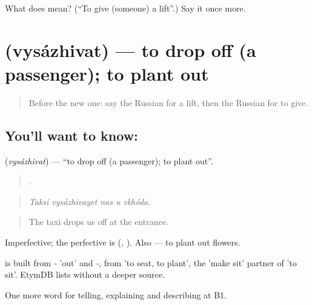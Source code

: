 \begin{tcolorbox}[breakable,colback=teal!4,colframe=teal!35!black,title={Before you move on}]
What does  mean? (\textquotedblleft{}To give (someone) a lift\textquotedblright{}.) Say it once more.
\end{tcolorbox}
\section[\texorpdfstring{\ru{высаживать} (vysázhivat)}{высаживать (vysázhivat)}]{ (vysázhivat) — to drop off (a passenger); to plant out}

\label{lesson:RU-C411-vysazhivat}



\begin{quote}
Before the new one: say the Russian for a lift, then the Russian for to give.
\end{quote}

\subsection*{You'll want to know: }
\textbf{} (\emph{vysázhivat}) — \textquotedblleft{}to drop off (a passenger); to plant out\textquotedblright{}.

\begin{quote}
    .
\end{quote}

\begin{quote}
\emph{Taksí vysázhivayet nas u vkhóda.}
\end{quote}

\begin{quote}
The taxi drops us off at the entrance.
\end{quote}

Imperfective; the perfective is \emph{} (\emph{, }). Also \emph{ } — to plant out flowers.

\begin{cousinweb}
\emph{} is built from \emph{-} 'out' and \emph{-}, from \emph{} 'to seat, to plant', the 'make sit' partner of \emph{} 'to sit'. EtymDB lists \emph{} without a deeper source.
\end{cousinweb}

\begin{grammarlens}[title={What you've built}]
One more word for telling, explaining and describing at B1.
\end{grammarlens}


